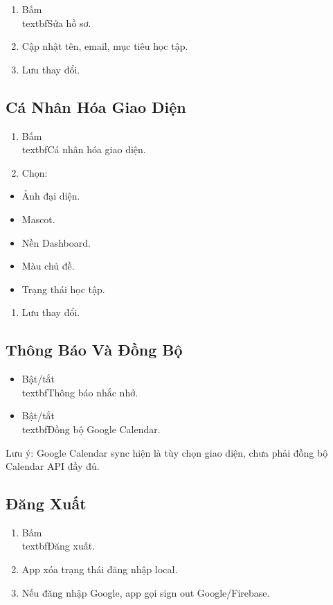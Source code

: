 \documentclass[12pt,a4paper]{report}
\begin{document}
\begin{enumerate}
\item Bấm \\textbf{Sửa hồ sơ}.
\item Cập nhật tên, email, mục tiêu học tập.
\item Lưu thay đổi.
\end{enumerate}

\subsection{Cá Nhân Hóa Giao Diện}

\begin{enumerate}
\item Bấm \\textbf{Cá nhân hóa giao diện}.
\item Chọn:
\end{enumerate}
\begin{itemize}
\item Ảnh đại diện.
\item Mascot.
\item Nền Dashboard.
\item Màu chủ đề.
\item Trạng thái học tập.
\end{itemize}
\begin{enumerate}
\item Lưu thay đổi.
\end{enumerate}

\subsection{Thông Báo Và Đồng Bộ}

\begin{itemize}
\item Bật/tắt \\textbf{Thông báo nhắc nhở}.
\item Bật/tắt \\textbf{Đồng bộ Google Calendar}.
\end{itemize}

Lưu ý: Google Calendar sync hiện là tùy chọn giao diện, chưa phải đồng bộ Calendar API đầy đủ.

\subsection{Đăng Xuất}

\begin{enumerate}
\item Bấm \\textbf{Đăng xuất}.
\item App xóa trạng thái đăng nhập local.
\item Nếu đăng nhập Google, app gọi sign out Google/Firebase.
\end{enumerate}
\end{document}
